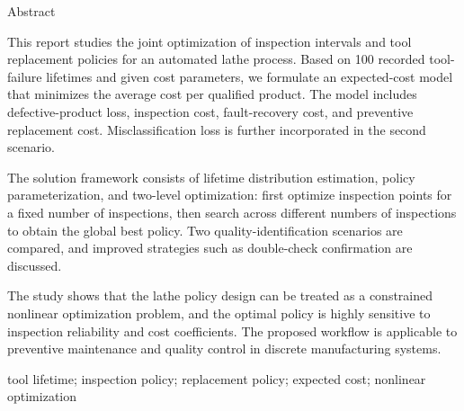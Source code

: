 \thispagestyle{plain}
{}
\centerline{\heiti Abstract}

\linespread{1.3}\bigskip

This report studies the joint optimization of inspection intervals and tool replacement policies for an automated lathe process. Based on 100 recorded tool-failure lifetimes and given cost parameters, we formulate an expected-cost model that minimizes the average cost per qualified product. The model includes defective-product loss, inspection cost, fault-recovery cost, and preventive replacement cost. Misclassification loss is further incorporated in the second scenario.

The solution framework consists of lifetime distribution estimation, policy parameterization, and two-level optimization: first optimize inspection points for a fixed number of inspections, then search across different numbers of inspections to obtain the global best policy. Two quality-identification scenarios are compared, and improved strategies such as double-check confirmation are discussed.

The study shows that the lathe policy design can be treated as a constrained nonlinear optimization problem, and the optimal policy is highly sensitive to inspection reliability and cost coefficients. The proposed workflow is applicable to preventive maintenance and quality control in discrete manufacturing systems.

\bigskip
{}
tool lifetime; inspection policy; replacement policy; expected cost; nonlinear optimization
